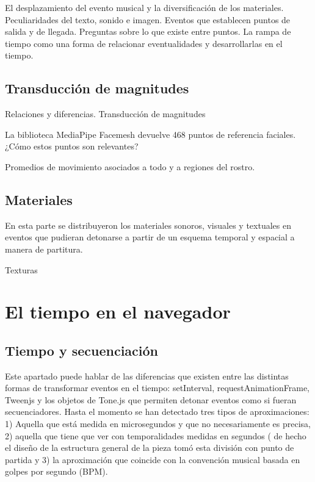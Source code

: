 El desplazamiento del evento musical y la diversificación de los materiales. Peculiaridades del texto, sonido e imagen. Eventos que establecen puntos de salida y de llegada. Preguntas sobre lo que existe entre puntos. La rampa de tiempo como una forma de relacionar eventualidades y desarrollarlas en el tiempo.

\subsection{Transducción de magnitudes}

Relaciones y diferencias. Transducción de magnitudes 

La biblioteca MediaPipe Facemesh devuelve 468 puntos de referencia faciales. ¿Cómo estos puntos son relevantes? 

Promedios de movimiento asociados a todo y a regiones del rostro. 

\subsection{Materiales}


En esta parte se distribuyeron los materiales sonoros, visuales y textuales en eventos que pudieran detonarse a partir de un esquema temporal y espacial a manera de partitura. 

Texturas

\section{El tiempo en el navegador}

\subsection{Tiempo y secuenciación}

Este apartado puede hablar de las diferencias que existen entre las distintas formas de transformar eventos en el tiempo: setInterval, requestAnimationFrame, Tweenjs y los objetos de Tone.js que permiten detonar eventos como si fueran secuenciadores. Hasta el momento se han detectado tres tipos de aproximaciones: 1) Aquella que está medida en microsegundos y que no necesariamente es precisa, 2) aquella que tiene que ver con temporalidades medidas en segundos ( de hecho el diseño de la estructura general de la pieza tomó esta división con punto de partida y 3) la aproximación que coincide con la convención musical basada en golpes por segundo (BPM). 

